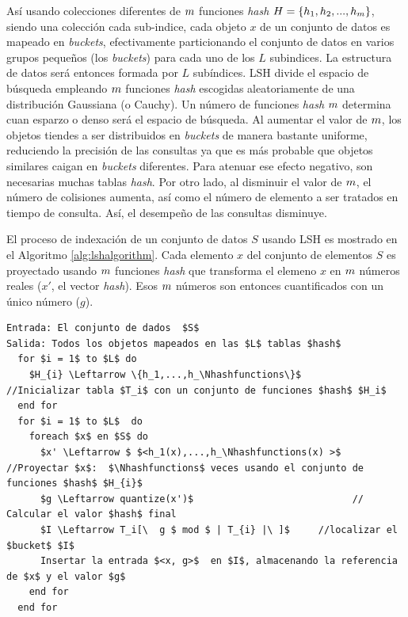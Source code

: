 Así usando colecciones diferentes de $m$ funciones \textit{hash} $H = \{h_1, h_2, ..., h_m\}$, siendo una colección cada sub-indice, cada objeto $x$ de un conjunto de datos es mapeado en \textit{buckets}, efectivamente particionando el conjunto de datos en varios grupos pequeños (los \textit{buckets}) para cada uno de los $L$ subindices. La estructura de datos será entonces formada por $L$ subíndices. LSH divide el espacio de búsqueda empleando $m$ funciones \textit{hash} escogidas aleatoriamente de una distribución Gaussiana (o Cauchy). Un número de funciones \textit{hash} $m$ determina cuan esparzo o denso será el espacio de búsqueda. Al aumentar el valor de $m$, los objetos tiendes a ser distribuidos en \textit{buckets} de manera bastante uniforme, reduciendo la precisión de las consultas ya que es más probable que objetos similares caigan en \textit{buckets} diferentes. Para atenuar ese efecto negativo, son necesarias muchas tablas \textit{hash}. Por otro lado, al disminuir el valor de $m$, el número de colisiones aumenta, así como el número de elemento a ser tratados en tiempo de consulta. Así, el desempeño de las consultas disminuye.


El proceso de indexación de un conjunto de datos $S$ usando LSH es mostrado en el Algoritmo \ref{alg:lshalgorithm}. Cada elemento $x$ del conjunto de elementos $S$ es proyectado usando   $m$  funciones \textit{hash} que transforma el elemeno $x$ en $m$  números reales ($x'$, el vector \textit{hash}). Esos $m$  números son entonces cuantificados con un único número ($g$).

\begin{lstlisting}[mathescape, frame=single, label=alg:lshalgorithm,caption=Algoritmo de construcción para LSH]
Entrada: El conjunto de dados  $S$
Salida: Todos los objetos mapeados en las $L$ tablas $hash$
  for $i = 1$ to $L$ do
    $H_{i} \Leftarrow \{h_1,...,h_\Nhashfunctions\}$       //Inicializar tabla $T_i$ con un conjunto de funciones $hash$ $H_i$
  end for
  for $i = 1$ to $L$  do
    foreach $x$ en $S$ do
      $x' \Leftarrow $ $<h_1(x),...,h_\Nhashfunctions(x) >$  //Proyectar $x$:  $\Nhashfunctions$ veces usando el conjunto de funciones $hash$ $H_{i}$
      $g \Leftarrow quantize(x')$                            // Calcular el valor $hash$ final
      $I \Leftarrow T_i[\  g $ mod $ | T_{i} |\ ]$     //localizar el $bucket$ $I$
      Insertar la entrada $<x, g>$  en $I$, almacenando la referencia de $x$ y el valor $g$
    end for
  end for
\end{lstlisting}


